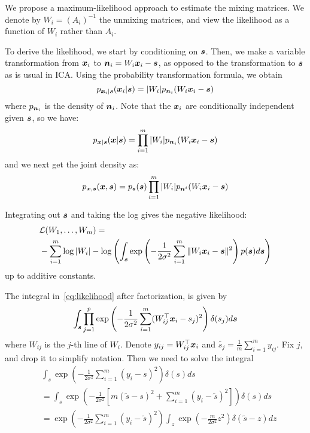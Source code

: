 We propose a maximum-likelihood approach to estimate the mixing matrices. 
We denote by $W_i = (A_i)^{-1}$ the unmixing matrices, and view the likelihood
as a function of $W_i$ rather than $A_i$.

To derive the likelihood, we start by conditioning on $\boldsymbol{s}$. Then, we make a variable transformation from $\boldsymbol{x}_i$ to $\boldsymbol{n}_i=W_i\boldsymbol{x}_i-\boldsymbol{s}$, as opposed to the transformation to $\boldsymbol{s}$ as is usual in ICA. Using the probability transformation formula, we obtain
\begin{equation}
p_{\boldsymbol{x}_i|\boldsymbol{s}}(\boldsymbol{x}_i|\boldsymbol{s})=|W_i|p_{\boldsymbol{n}_i}(W_i\boldsymbol{x}_i-\boldsymbol{s})    
\end{equation}
where $p_{\boldsymbol{n}_i}$ is the density of $\boldsymbol{n}_i$. Note that the $\boldsymbol{x}_i$ are conditionally independent given $\boldsymbol{s}$, so we have:
\begin{equation}
  p_{\boldsymbol{x}|\boldsymbol{s}}(\boldsymbol{x}|\boldsymbol{s})=\prod_{i=1}^m  |W_i| p_{\boldsymbol{n}_i}(W_i\boldsymbol{x}_i-\boldsymbol{s})
\end{equation}
and we next get the joint density as:
\begin{equation}
  p_{\boldsymbol{x}, \boldsymbol{s}}(\boldsymbol{x},\boldsymbol{s})=p_{\boldsymbol{s}}(\boldsymbol{s}) \prod_{i=1}^m  |W_i| p_{\boldsymbol{n}^i}(W_i\boldsymbol{x}_i-\boldsymbol{s})
\end{equation}

Integrating out $\boldsymbol{s}$ and taking the log gives the negative likelihood:
\begin{align} 
  \label{eq:likelihood}
 &\mathcal{L}(W_1, \dots, W_m) =  \nonumber
  \\& -\sum_{i=1}^m\log|W_i| -  \log\left(\int_{\boldsymbol{s}}\exp\left(-\frac1{2\sigma^2}\sum_{i=1}^m\|W_i\boldsymbol{x}_i - \boldsymbol{s}\|^2\right)p(\boldsymbol{s})d\boldsymbol{s}\right)
\end{align}
up to additive constants.

The integral in~\ref{eq:likelihood} after factorization, is given by
\begin{equation}
\int_{\boldsymbol{s}} \prod_{j=1}^p \exp \left( -\frac{1}{2\sigma^2} \sum_{i=1}^m (W_{ij}^{\top}\boldsymbol{x}_i-s_j)^2 \right) \delta(s_j) d\boldsymbol{s}
\end{equation}
where $W_{ij}$ is the $j$-th line of $W_i$. Denote $y_{ij}=W_{ij}^{\top}\boldsymbol{x}_i$ and $\tilde{s_j}=\frac1m\sum_{i=1}^m y_{ij}$.  Fix $j$, and drop it to simplify notation. Then we need to solve the integral
\begin{align*}
   &\int_s \exp \left(-\frac{1}{2\sigma^2} \sum_{i=1}^m (y_i-s)^2 \right) \delta(s)ds\\
   &=\int_s \exp \left(-\frac{1}{2\sigma^2} [ m(\tilde{s}-s)^2 + \sum_{i=1}^m (y_i-\tilde{s})^2] \right) \delta(s)ds \\ 
&= \exp \left(-\frac{1}{2\sigma^2}\sum_{i=1}^m (y_i-\tilde{s})^2 \right) 
\int_z \exp \left(-\frac{m}{2\sigma^2} z^2 \right) \delta(\tilde{s}-z) dz
\end{align*}

